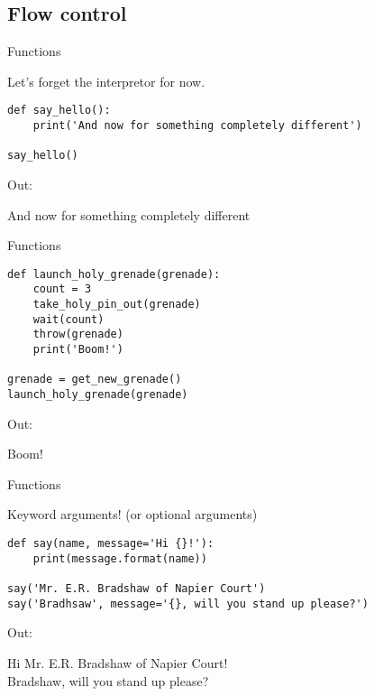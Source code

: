 \documentclass[ignorenonframetext,]{beamer}
\begin{document}
\subsection{Flow control}

\begin{frame}[fragile]{Functions}

    Let's forget the interpretor for now.

    \begin{verbatim}
def say_hello():
    print('And now for something completely different')

say_hello()
    \end{verbatim}

Out:
    \begin{tcolorbox}
And now for something completely different
    \end{tcolorbox}
\end{frame}

\begin{frame}[fragile]{Functions}

    \begin{verbatim}
def launch_holy_grenade(grenade):
    count = 3
    take_holy_pin_out(grenade)
    wait(count)
    throw(grenade)
    print('Boom!')

grenade = get_new_grenade()
launch_holy_grenade(grenade)
    \end{verbatim}

Out:
    \begin{tcolorbox}
Boom!
    \end{tcolorbox}
\end{frame}

\begin{frame}[fragile]{Functions}

    Keyword arguments! (or optional arguments)

    \begin{verbatim}
def say(name, message='Hi {}!'):
    print(message.format(name))

say('Mr. E.R. Bradshaw of Napier Court')
say('Bradhsaw', message='{}, will you stand up please?')
    \end{verbatim}

Out:
    \begin{tcolorbox}
Hi Mr. E.R. Bradshaw of Napier Court!\\
Bradshaw, will you stand up please?
    \end{tcolorbox}
\end{frame}
\end{document}
